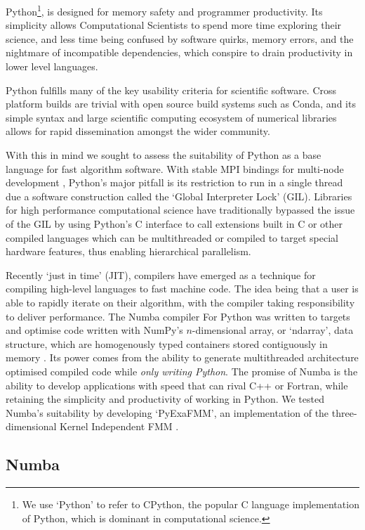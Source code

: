 Python\footnote{We use `Python' to refer to CPython, the popular C language implementation of Python, which is dominant in computational science.}, is designed for memory safety and programmer productivity. Its simplicity allows Computational Scientists to spend more time exploring their science, and less time being confused by software quirks, memory errors, and the nightmare of incompatible dependencies, which conspire to drain productivity in lower level languages.

Python fulfills many of the key usability criteria for scientific software. Cross platform builds are trivial with open source build systems such as Conda, and its simple syntax and large scientific computing ecosystem of numerical libraries allows for rapid dissemination amongst the wider community.

With this in mind we sought to assess the suitability of Python as a base language for fast algorithm software. With stable MPI bindings for multi-node development \cite{dalcin2021mpi4py}, Python's major pitfall is its restriction to run in a single thread due a software construction called the `Global Interpreter Lock' (GIL). Libraries for high performance computational science have traditionally bypassed the issue of the GIL by using Python's C interface to call extensions built in C or other compiled languages which can be multithreaded or compiled to target special hardware features, thus enabling hierarchical parallelism.

Recently `just in time' (JIT), compilers have emerged as a technique for compiling high-level languages to fast machine code. The idea being that a user is able to rapidly iterate on their algorithm, with the compiler taking responsibility to deliver performance. The Numba compiler For Python was written to targets and optimise code written with NumPy's $n$-dimensional array, or `ndarray', data structure, which are homogenously typed containers stored contiguously in memory \cite{lam2015numba}. Its power comes from the ability to generate multithreaded architecture optimised compiled code while \textit{only writing Python}. The promise of Numba is the ability to develop applications with speed that can rival C++ or Fortran, while retaining the simplicity and productivity of working in Python. We tested Numba's suitability by developing `PyExaFMM', an implementation of the three-dimensional Kernel Independent FMM \cite{kailasa2022pyexafmm}.

\subsection*{Numba}


